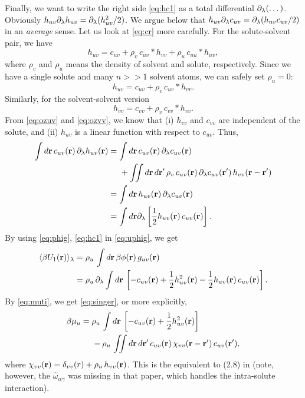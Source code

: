 \documentclass[12pt]{article}
\begin{document}
Finally, we want to write the right side \eqref{eq:hc1} as
a total differential $\partial_\lambda(\dots)$.
%
Obviously $h_{uv} \partial_\lambda h_{uv} = \partial_\lambda ( h_{uv}^2/2 )$.
%
We argue below that $h_{uv} \partial_\lambda c_{uv} = \partial_\lambda ( h_{uv} c_{uv} /2) $
in an \emph{average} sense.
Let us look at \eqref{eq:cr} more carefully.
%
For the solute-solvent pair, we have
\[
  h_{uv} = c_{uv} + \rho_v \, c_{uv}*h_{vv}
  + \rho_u \, c_{uu}*h_{uv},
\]
where $\rho_v$ and $\rho_u$ means the density of
solvent and solute, respectively.
%
Since we have a single solute and many $n >> 1$ solvent atoms,
we can safely set $\rho_u = 0$:
\begin{equation}
  h_{uv} = c_{uv} + \rho_v \, c_{uv}*h_{vv}.
  \label{eq:ozuv}
\end{equation}
Similarly, for the solvent-solvent version
\begin{equation}
  h_{vv} = c_{vv} + \rho_v \, c_{vv}*h_{vv}.
  \label{eq:ozvv}
\end{equation}
From \eqref{eq:ozuv} and \eqref{eq:ozvv}, we know that
  (i) $h_{vv}$ and $c_{vv}$ are independent of the solute,
  and
  (ii) $h_{uv}$ is a linear function with respect to $c_{uv}$.
%
Thus,
\begin{align}
  \int d\mathbf{r} \, c_{uv}(\mathbf{r}) \, \partial_\lambda h_{uv}(\mathbf{r})
  &=
  \int d\mathbf{r} \,
  c_{uv}(\mathbf{r}) \, \partial_\lambda c_{uv}(\mathbf{r}) \notag \\
  & \;\;\;\;\;
    +
    \iint d\mathbf{r} \, d\mathbf{r}'
    \, \rho_v
    \, c_{uv}(\mathbf{r})
    \, \partial_\lambda c_{uv}(\mathbf{r}') \, h_{vv}(\mathbf{r} - \mathbf{r}') \notag \\
  &= \int d\mathbf{r} \, h_{uv}(\mathbf{r}) \, \partial_\lambda c_{uv}(\mathbf{r}) \notag \\
  &= \int d\mathbf{r} \partial_\lambda
    \left[
      \frac{1}{2} h_{uv}(\mathbf{r}) \,  c_{uv}(\mathbf{r})
    \right].
  \label{eq:phig}
\end{align}
%
By using \eqref{eq:phig}, \eqref{eq:hc1} in \eqref{eq:uphig}, we get
%
\begin{align*}
  \langle
  \beta U_1(\mathbf{r})
  \rangle_\lambda
  &=
  \rho_u \,
  \int d \mathbf{r}
  \, \beta \phi(\mathbf{r}) \, g_{uv}(\mathbf{r}) \\
  &=
   \rho_u \, \partial_\lambda \int d \mathbf{r} \,
   \left[
    - c_{uv}(\mathbf{r})
    + \frac{1}{2} h_{uv}^2(\mathbf{r})
    - \frac{1}{2} h_{uv}(\mathbf{r}) \, c_{uv}(\mathbf{r})
    \right].
  \end{align*}
%
%
%
By \eqref{eq:muti}, we get \eqref{eq:singer}, or more explicitly,
\begin{align}
  \beta \mu_u
  &=
   \rho_u \, \int
    d \mathbf{r} \,
   \left[
    - c_{uv}(\mathbf{r})
    + \frac{1}{2} h_{uv}^2(\mathbf{r})
    \right]
  \notag \\
  & \;\;\;\;\;
    -
    \rho_u \, \iint d\mathbf{r} \, d\mathbf{r}'
    \, c_{uv}(\mathbf{r})
    \, \chi_{vv}(\mathbf{r} - \mathbf{r}')
    \, c_{uv}(\mathbf{r}'),
 \label{eq:muexpanded}
\end{align}
where
$\chi_{vv}(\mathbf{r}) = \delta_{vv}(r) + \rho_u \, h_{vv}(\mathbf{r})$.
%
This is the equivalent to (2.8) in \cite{singer} (note, however,
the $\hat \omega_{\alpha\gamma}$ was missing in that paper,
which handles the intra-solute interaction).
\end{document}
